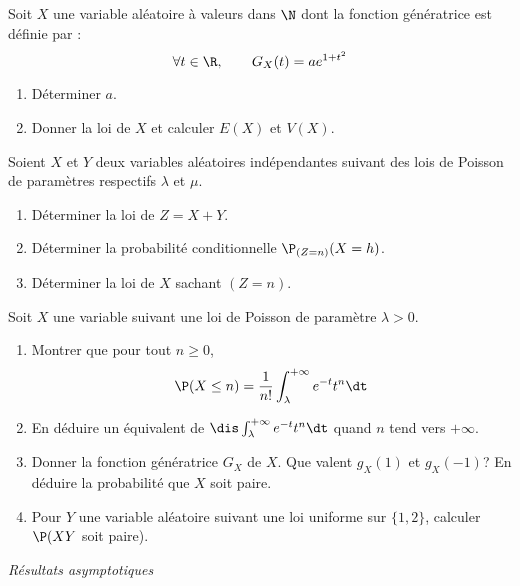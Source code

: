 \documentclass[a4paper,10pt]{report}
\begin{document}
\begin{Exercice}{} Soit $X$ une variable al\'eatoire \`a valeurs dans $\N$ dont la fonction g\'en\'eratrice est définie par :
$$\forall t\in\R,\qquad G_X(t)=ae^{1+t^2}$$

\begin{enumerate}
	\item D\'eterminer $a.$
	
	\item Donner la loi de $X$ et calculer $E(X)$ et $V(X).$
	
\end{enumerate}
\end{Exercice}



\begin{Exercice}{}
Soient $X$ et $Y$ deux variables aléatoires indépendantes suivant des lois de Poisson de paramètres respectifs $\lambda$ et $\mu$.
\begin{enumerate}
\item Déterminer la loi de $Z=X+Y$.
\item Déterminer la probabilité conditionnelle $\P_{(Z=n)}(X=h)$.
\item Déterminer la loi de $X$ sachant $(Z=n)$.
\end{enumerate}
\end{Exercice}




\begin{Exercice}{}
Soit $X$ une variable suivant une loi de Poisson de paramètre $\lambda>0$. 
\begin{enumerate}
\item Montrer que pour tout $n \geq 0$,
$$ \P(X \leq n) = \dfrac{1}{n!} \int_{\lambda}^{+ \infty} e^{-t} t^n \dt$$
\item En déduire un équivalent de $\dis \int_{\lambda}^{+ \infty} e^{-t} t^n \dt$ quand $n$ tend vers $+ \infty$.
\item Donner la fonction génératrice $G_X$ de $X$. Que valent $g_X(1)$ et $g_X(-1)$? En déduire la probabilité que $X$ soit paire.
\item Pour $Y$ une variable aléatoire suivant une loi uniforme sur $\lbrace 1,2 \rbrace$, calculer $\P(XY$ soit paire).
\end{enumerate}
\end{Exercice}


\newpage


\begin{center}
\textit{{ {\large Résultats asymptotiques}}}
\end{center}
\end{document}
